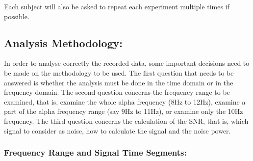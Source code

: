 Each subject will also be asked to repeat each experiment multiple times if possible.

\subsection{\bf{Analysis Methodology:}}

In order to analyse correctly the recorded data, some important decisions need to be made on the methodology to be used. The first question that needs to be answered is whether the analysis must be done in the time domain or in the frequency domain. The second question concerns the frequency range to be examined, that is, examine the whole alpha frequency (8Hz to 12Hz), examine a part of the alpha frequency range (say 9Hz to 11Hz), or examine only the 10Hz frequency. The third question concerns the calculation of the SNR, that is, which signal to consider as noise, how to calculate the signal and the noise power.   

\subsubsection{\bf{Frequency Range and Signal Time Segments:}}

